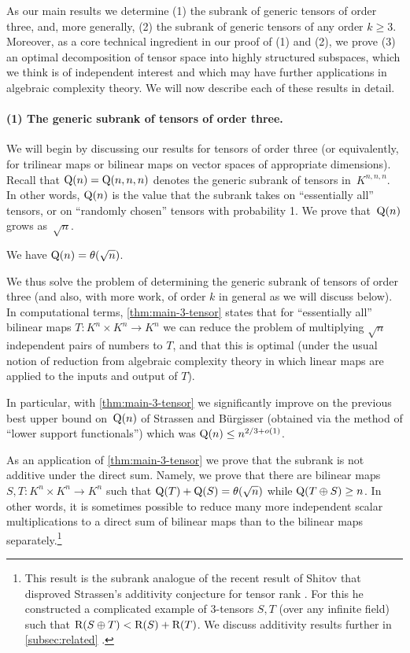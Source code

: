 \documentclass[11pt]{article}
\theoremstyle{definition}
\theoremstyle{remark}
\newcommand{\trk}{{\rm R}}
\newcommand{\subrank}{{\rm Q}}
\newcommand{\gensubrank}{{\rm Q}}
\begin{document}
As our main results we determine (1) the subrank of generic tensors of order three, 
and, more generally, (2) the subrank of generic tensors of any order $k \geq 3$. 
Moreover, as a core technical ingredient in our proof of (1) and (2), we prove (3) an optimal decomposition of tensor space into highly structured subspaces, which we think is of independent interest and which may have further applications in algebraic complexity theory. We will now describe each of these results in detail.

\paragraph{(1) The generic subrank of tensors of order three.}
We will begin by discussing our results for tensors of order three (or equivalently, for trilinear maps 
or bilinear maps on vector spaces of appropriate dimensions). 
Recall that $\gensubrank(n) = \gensubrank(n,n,n)$ denotes the generic subrank of tensors in~$K^{n,n,n}$. In other words, $\gensubrank(n)$ is the value that the subrank takes on ``essentially all'' tensors, or on ``randomly chosen'' tensors with probability 1. We prove that~$\gensubrank(n)$ grows as~$\sqrt{n}$.

\begin{theorem}\label{thm:main-3-tensor}
We have $\gensubrank(n) = \theta(\sqrt{n})$.
\end{theorem}

We thus solve the problem of determining the generic subrank of tensors of order three (and also, with more work, of order $k$ in general as we will discuss below).
In computational terms, \autoref{thm:main-3-tensor} states that for ``essentially all'' bilinear maps $T : K^n \times K^n \to K^n$ we can reduce the problem of multiplying $\sqrt{n}$ independent pairs of numbers  to $T$, and that this is optimal (under the usual notion of reduction from algebraic complexity theory in which linear maps are applied to the inputs and output of $T$). 

In particular, with \autoref{thm:main-3-tensor} we significantly improve on the previous best upper bound on~$\gensubrank(n)$ of Strassen and Bürgisser (obtained via the method of ``lower support functionals'') which was $\gensubrank(n) \leq n^{2/3 + o(1)}$.

As an application of \autoref{thm:main-3-tensor} we prove that the subrank is not additive under the direct sum. Namely, we prove that there are bilinear maps $S,T : K^n \times K^n \to K^n$ such that $\subrank(T) + \subrank(S) = \theta(\sqrt{n})$ while $\subrank(T \oplus S) \geq n$. In other words, it is sometimes possible to reduce many more independent scalar multiplications to a direct sum of bilinear maps than to the bilinear maps separately.\footnote{This result is the subrank analogue of the recent result of Shitov \cite{MR3974478} that disproved Strassen's additivity conjecture for tensor rank \cite{MR521168}. For this he constructed a complicated example of 3-tensors $S,T$ (over any infinite field) such that $\trk(S \oplus T) < \trk(S) + \trk(T)$. We discuss additivity results further in \autoref{subsec:related}
.}
%
\end{document}

